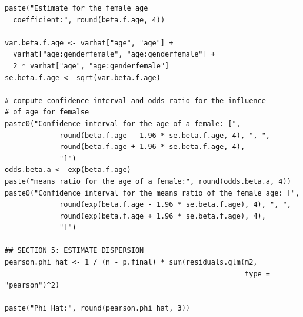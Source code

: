 \documentclass[a4paper,11pt]{article}
\begin{document}
\begin{verbatim}
paste("Estimate for the female age
  coefficient:", round(beta.f.age, 4))

var.beta.f.age <- varhat["age", "age"] +
  varhat["age:genderfemale", "age:genderfemale"] +
  2 * varhat["age", "age:genderfemale"]
se.beta.f.age <- sqrt(var.beta.f.age)

# compute confidence interval and odds ratio for the influence
# of age for femalse
paste0("Confidence interval for the age of a female: [",
             round(beta.f.age - 1.96 * se.beta.f.age, 4), ", ",
             round(beta.f.age + 1.96 * se.beta.f.age, 4),
             "]")
odds.beta.a <- exp(beta.f.age)
paste("means ratio for the age of a female:", round(odds.beta.a, 4))
paste0("Confidence interval for the means ratio of the female age: [",
             round(exp(beta.f.age - 1.96 * se.beta.f.age), 4), ", ",
             round(exp(beta.f.age + 1.96 * se.beta.f.age), 4),
             "]")

## SECTION 5: ESTIMATE DISPERSION
pearson.phi_hat <- 1 / (n - p.final) * sum(residuals.glm(m2,
                                                         type = "pearson")^2)

paste("Phi Hat:", round(pearson.phi_hat, 3))

\end{verbatim}
\end{document}

